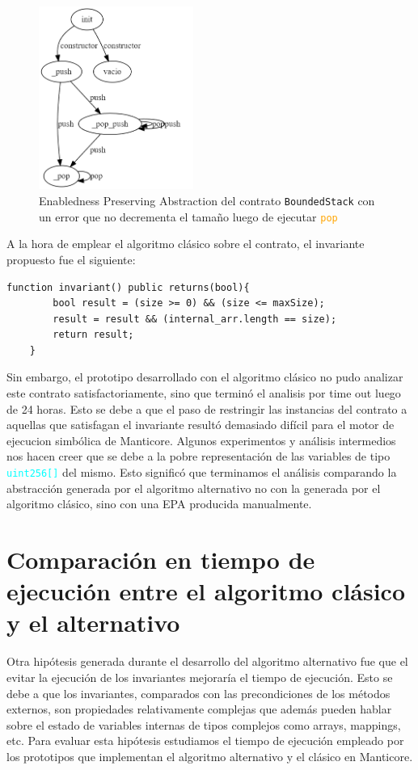 \begin{figure}[H]
    \centering
    \includegraphics[width=0.45\textwidth]{figs/buggy-bounded-stack-epa.png}
    \caption{Enabledness Preserving Abstraction del contrato \texttt{BoundedStack} con un error que no decrementa el tamaño luego de ejecutar \textcolor{orange}{\texttt{pop}} }
    \label{fig:buggy-bounded-stack-epa}
\end{figure}

A la hora de emplear el algoritmo clásico sobre el contrato, el invariante propuesto fue el siguiente:
\begin{lstlisting}[language=Solidity]
    function invariant() public returns(bool){
        bool result = (size >= 0) && (size <= maxSize);
        result = result && (internal_arr.length == size);
        return result;
    }
\end{lstlisting}

Sin embargo, el prototipo desarrollado con el algoritmo clásico no pudo analizar este contrato satisfactoriamente, sino que terminó el analisis por time out luego de 24 horas.
Esto se debe a que el paso de restringir las instancias del contrato a aquellas que satisfagan el invariante resultó demasiado difícil para el motor de ejecucion simbólica de Manticore.
Algunos experimentos y análisis intermedios nos hacen creer que se debe a la pobre representación de las variables de tipo \textcolor{cyan}{\texttt{uint256[]}} del mismo.
Esto significó que terminamos el análisis comparando la abstracción generada por el algoritmo alternativo no con la generada por el algoritmo clásico, sino con una EPA producida manualmente.

\section{Comparación en tiempo de ejecución entre el algoritmo clásico y el alternativo}
Otra hipótesis generada durante el desarrollo del algoritmo alternativo fue que el evitar la ejecución de los invariantes mejoraría el tiempo de ejecución.
Esto se debe a que los invariantes, comparados con las precondiciones de los métodos externos, son propiedades relativamente complejas que además pueden hablar sobre el estado de variables internas de tipos complejos como arrays, mappings, etc.
Para evaluar esta hipótesis estudiamos el tiempo de ejecución empleado por los prototipos que implementan el algoritmo alternativo y el clásico en Manticore.

